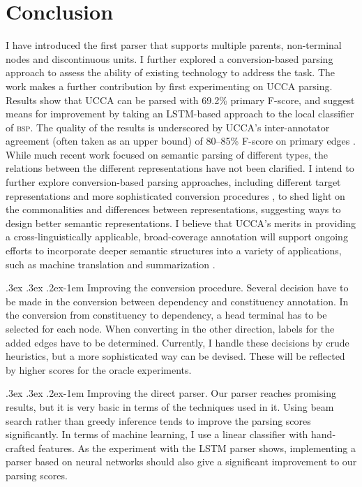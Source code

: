 \documentclass[11pt]{article}
\makeatletter
\renewcommand{\paragraph}{
  \@startsection{paragraph}{4}
  {\z@}{.3ex \@plus .3ex \@minus .2ex}{-1em}
  {\normalfont\normalsize\bfseries}
}
\makeatother
\begin{document}
\section{Conclusion}\label{sec:conclusion}

I have introduced the first parser that supports multiple parents, non-terminal
nodes and discontinuous units.
I further explored a conversion-based parsing approach to assess the ability of existing
technology to address the task.
The work makes a further contribution by first experimenting on UCCA parsing.
Results show that UCCA can be parsed with 69.2\% primary F-score,
and suggest means for improvement by taking an LSTM-based
approach to the local classifier of \textsc{bsp}.
The quality of the results is underscored by UCCA's inter-annotator
agreement (often taken as an upper bound) of 
80--85\% F-score on primary edges \cite{abend2013universal}.
While much recent work focused on semantic parsing of different types,
the relations between the different representations have not been clarified.
I intend to further explore conversion-based parsing approaches,
including different target representations and more sophisticated conversion procedures \cite{kong-15},
to shed light on the commonalities and differences between representations, suggesting ways to
design better semantic representations.
I believe that UCCA's merits in providing a cross-linguistically applicable, broad-coverage
annotation will support ongoing efforts to incorporate deeper semantic structures
into a variety of applications, such as machine translation \cite{jones2012semantics}
and summarization \cite{liu2015toward}.

\paragraph{Improving the conversion procedure.}
Several decision have to be made in the conversion between dependency and
constituency annotation.
In the conversion from constituency to dependency, a head terminal has to be
selected for each node. When converting in the other direction, labels for the
added edges have to be determined.
Currently, I handle these decisions by crude heuristics, but a more
sophisticated way can be devised. These will be reflected by higher scores for
the oracle experiments.

\paragraph{Improving the direct parser.}
Our parser reaches promising results, but it is very basic in terms of the
techniques used in it. Using beam search rather than greedy inference tends to
improve the parsing scores significantly.
In terms of machine learning, I use a linear classifier with hand-crafted
features. As the experiment with the LSTM parser shows, implementing a parser
based on neural networks should also give a significant improvement to our
parsing scores.





\end{document}
